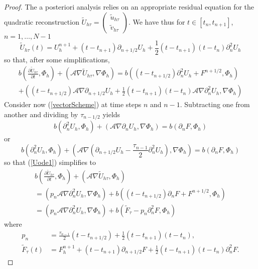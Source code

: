 \documentclass{imanum}
\begin{document}
\begin{proof}
The a posteriori analysis relies on an appropriate residual equation for the quad\-ra\-tic reconstruction $\tilde{U}_{h\tau}=\begin{pmatrix} \tilde{u}_{h\tau}\\ \tilde{v}_{h\tau}\end{pmatrix}$. We have thus for $t \in [t_n,t_{n + 1}]$, $n = 1, \ldots, N-1$
\begin{equation}
  \tilde{U}_{h\tau} (t) = U^{n + 1}_h + (t - t_{n + 1}) \partial_{n +
  1/2} U_h + \frac{1}{2}  (t - t_{n + 1})  (t - t_n) \partial_n^2 U_h
\end{equation}
so that, after some simplifications,
\begin{multline}\label{Uode1}
{b} \left( \frac{\partial \tilde{U}_{h\tau}}{\partial t}, \Phi_h
   \right) + (\mathcal{A} \nabla \tilde{U}_{h\tau}, \nabla \Phi_h)
   ={b} \left( (t - t_{n + 1/2}) \partial_n^2 U_h + F^{n+1/2},
   \Phi_h \right) \\
   + \left( (t - t_{n + 1/2}) \mathcal{A} \nabla
   \partial_{n + 1/2} U_h + \frac{1}{2} (t - t_{n + 1}) (t - t_n)
   \mathcal{A} \nabla \partial_n^2 U_h, \nabla \Phi_h \right)
\end{multline}
Consider now (\ref{vectorScheme}) at time steps $n$ and $n - 1$. Subtracting one from another and dividing by $\tau_{n - 1/2}$ yields
$$
{b} \left(\partial_n^2 U_h, \Phi_h\right) + \left(\mathcal{A} \nabla \partial_n
   U_h, \nabla \Phi_h\right) = {b}\left( \partial_n F, \Phi_h \right) 
$$
or
$$
{b} \left(\partial_n^2 U_h, \Phi_h\right) + \left(\mathcal{A} \nabla \left(
   \partial_{n + 1/2} U_h - \frac{\tau_{n - 1}}{2} \partial_n^2 U_h
   \right), \nabla \Phi_h \right) = 
   {b}\left(\partial_n F, \Phi_h \right) 
$$
so that (\ref{Uode1}) simplifies to
\begin{multline}\label{Uode2}
 {b} \left(\frac{\partial \tilde{U}_{h\tau}}{\partial t}, \Phi_h
   \right) + \left(\mathcal{A} \nabla \tilde{U}_{h\tau}, \Phi_h\right) \\
   = \left(p_n \mathcal{A} \nabla \partial_n^2 U_h, \nabla \Phi_h\right) + 
   {b}\left( \left(t - t_{n + 1/2}\right) \partial_n F + F^{n+1/2}, \Phi_h
   \right) \\
   = \left(p_n \mathcal{A} \nabla \partial_n^2 U_h, \nabla \Phi_h\right) + 
   {b}\left( \tilde{F}_\tau - p_n \partial^2_n F, \Phi_h\right) 
\end{multline}
where
\begin{align*} p_n &= \frac{\tau_{n - 1}}{2}  (t - t_{n + 1/2}) + \frac{1}{2}
   (t - t_{n + 1})  (t - t_n), \\
  \tilde{F}_{\tau} (t) &= F^{n + 1}_h + (t - t_{n + 1}) \partial_{n +
  1/2} F + \frac{1}{2}  (t - t_{n + 1})  (t - t_n) \partial_n^2 F.
\end{align*}


\end{proof}
\end{document}

